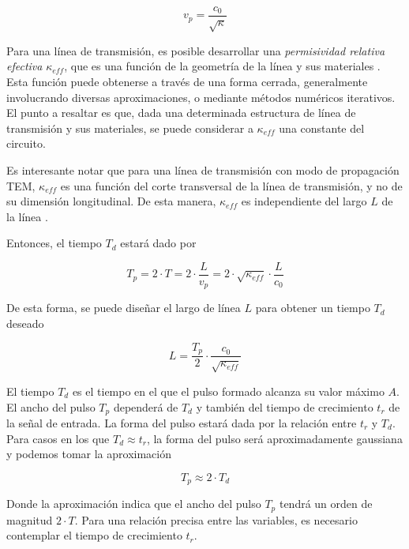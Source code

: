 \begin{equation}
  v_p = \frac{c_0}{\sqrt{\kappa}}
\end{equation}

Para una línea de transmisión, es posible desarrollar una \textit{permisividad
relativa efectiva} $\kappa_{eff}$, que es una función de la geometría de la
línea y sus materiales \cite{pozar2011}. Esta función puede obtenerse a través
de una forma cerrada, generalmente involucrando diversas aproximaciones, o
mediante métodos numéricos iterativos. El punto a resaltar es que, dada una
determinada estructura de línea de transmisión y sus materiales, se puede
considerar a $\kappa_{eff}$ una constante del circuito.

Es interesante notar que para una línea de transmisión con modo de propagación
TEM, $\kappa_{eff}$ es una función del corte transversal de la línea de
transmisión, y no de su dimensión longitudinal. De esta manera, $\kappa_{eff}$
es independiente del largo $L$ de la línea \cite{pozar2011}.

Entonces, el tiempo $T_d$ estará dado por

\begin{equation}
    T_p = 2 \cdot T = 2 \cdot \frac{L}{v_p} =2 \cdot \sqrt{\kappa_{eff}} \cdot \frac{L}{c_0}
\end{equation}

De esta forma, se puede diseñar el largo de línea $L$ para obtener un tiempo
$T_d$ deseado

\begin{equation}
    \label{eq:stub_length_vs_delay}
    L = \frac{T_p}{2} \cdot \frac{c_0}{\sqrt{\kappa_{eff}}}
\end{equation}

El tiempo $T_d$ es el tiempo en el que el pulso formado alcanza su valor máximo
$A$. El ancho del pulso $T_p$ dependerá de $T_d$ y también del tiempo de
crecimiento $t_r$ de la señal de entrada. La forma del pulso estará dada por la
relación entre $t_r$ y $T_d$. Para casos en los que $T_d \approx t_r$, la forma
del pulso será aproximadamente gaussiana y podemos tomar la aproximación

\begin{equation}
    T_p \approx 2 \cdot T_d
\end{equation}

Donde la aproximación indica que el ancho del pulso $T_p$ tendrá un orden de
magnitud $2 \cdot T$. Para una relación precisa entre las variables, es
necesario contemplar el tiempo de crecimiento $t_r$.

